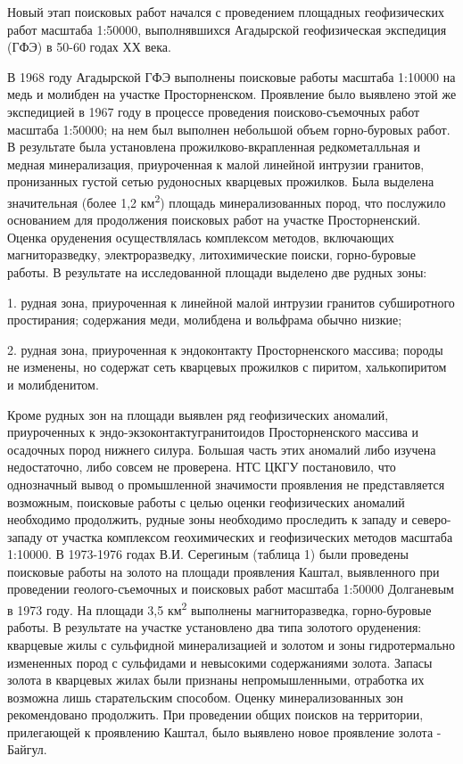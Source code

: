 \begin{multicols}{2}
Новый этап поисковых работ начался с проведением площадных геофизических
работ масштаба 1:50000, выполнявшихся Агадырской геофизическая
экспедиция (ГФЭ) в 50-60 годах ХХ века.

В 1968 году Агадырской ГФЭ выполнены поисковые работы масштаба 1:10000
на медь и молибден на участке Просторненском. Проявление было выявлено
этой же экспедицией в 1967 году в процессе проведения поисково-съемочных
работ масштаба 1:50000; на нем был выполнен небольшой объем
горно-буровых работ. В результате была установлена
прожилково-вкрапленная редкометалльная и медная минерализация,
приуроченная к малой линейной интрузии гранитов, пронизанных густой
сетью рудоносных кварцевых прожилков. Была выделена значительная (более
1,2 км\textsuperscript{2}) площадь минерализованных пород, что послужило
основанием для продолжения поисковых работ на участке Просторненский.
Оценка оруденения осуществлялась комплексом методов, включающих
магниторазведку, электроразведку, литохимические поиски, горно-буровые
работы. В результате на исследованной площади выделено две рудных зоны:

1. рудная зона, приуроченная к линейной малой интрузии гранитов
субширотного простирания; содержания меди, молибдена и вольфрама
обычно низкие;

2. рудная зона, приуроченная к эндоконтакту Просторненского массива;
породы не изменены, но содержат сеть кварцевых прожилков с пиритом,
халькопиритом и молибденитом.

Кроме рудных зон на площади выявлен ряд геофизических аномалий,
приуроченных к эндо-экзоконтактугранитоидов Просторненского массива и
осадочных пород нижнего силура. Большая часть этих аномалий либо изучена
недостаточно, либо совсем не проверена. НТС ЦКГУ постановило, что
однозначный вывод о промышленной значимости проявления не представляется
возможным, поисковые работы с целью оценки геофизических аномалий
необходимо продолжить, рудные зоны необходимо проследить к западу и
северо-западу от участка комплексом геохимических и геофизических
методов масштаба 1:10000. В 1973-1976 годах В.И. Серегиным (таблица 1)
были проведены поисковые работы на золото на площади проявления Каштал,
выявленного при проведении геолого-съемочных и поисковых работ масштаба
1:50000 Долганевым в 1973 году. На площади 3,5 км\textsuperscript{2}
выполнены магниторазведка, горно-буровые работы. В результате на участке
установлено два типа золотого оруденения: кварцевые жилы с сульфидной
минерализацией и золотом и зоны гидротермально измененных пород с
сульфидами и невысокими содержаниями золота. Запасы золота в кварцевых
жилах были признаны непромышленными, отработка их возможна лишь
старательским способом. Оценку минерализованных зон рекомендовано
продолжить. При проведении общих поисков на территории, прилегающей к
проявлению Каштал, было выявлено новое проявление золота - Байгул.
\end{multicols}

